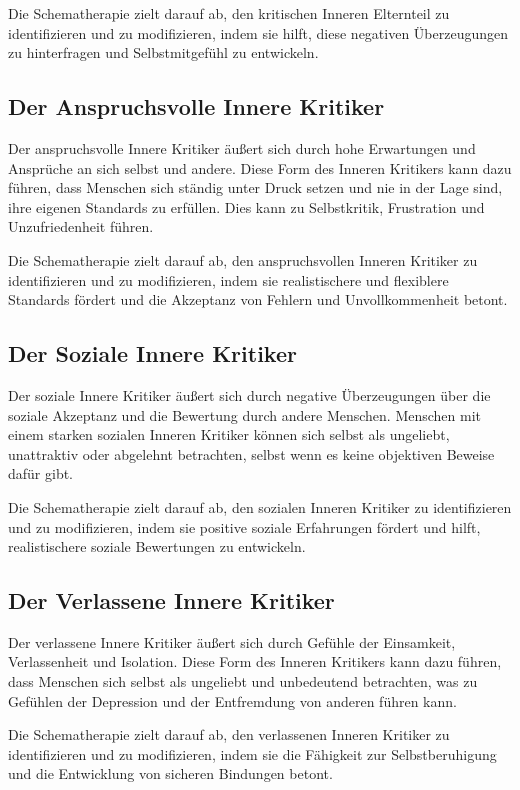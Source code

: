 Die Schematherapie zielt darauf ab, den kritischen Inneren Elternteil zu identifizieren und zu modifizieren, indem sie hilft, diese negativen Überzeugungen zu hinterfragen und Selbstmitgefühl zu entwickeln.

\subsection{Der Anspruchsvolle Innere Kritiker}

Der anspruchsvolle Innere Kritiker äußert sich durch hohe Erwartungen und Ansprüche an sich selbst und andere. Diese Form des Inneren Kritikers kann dazu führen, dass Menschen sich ständig unter Druck setzen und nie in der Lage sind, ihre eigenen Standards zu erfüllen. Dies kann zu Selbstkritik, Frustration und Unzufriedenheit führen.

Die Schematherapie zielt darauf ab, den anspruchsvollen Inneren Kritiker zu identifizieren und zu modifizieren, indem sie realistischere und flexiblere Standards fördert und die Akzeptanz von Fehlern und Unvollkommenheit betont.

\subsection{Der Soziale Innere Kritiker}

Der soziale Innere Kritiker äußert sich durch negative Überzeugungen über die soziale Akzeptanz und die Bewertung durch andere Menschen. Menschen mit einem starken sozialen Inneren Kritiker können sich selbst als ungeliebt, unattraktiv oder abgelehnt betrachten, selbst wenn es keine objektiven Beweise dafür gibt.

Die Schematherapie zielt darauf ab, den sozialen Inneren Kritiker zu identifizieren und zu modifizieren, indem sie positive soziale Erfahrungen fördert und hilft, realistischere soziale Bewertungen zu entwickeln.

\subsection{Der Verlassene Innere Kritiker}

Der verlassene Innere Kritiker äußert sich durch Gefühle der Einsamkeit, Verlassenheit und Isolation. Diese Form des Inneren Kritikers kann dazu führen, dass Menschen sich selbst als ungeliebt und unbedeutend betrachten, was zu Gefühlen der Depression und der Entfremdung von anderen führen kann.

Die Schematherapie zielt darauf ab, den verlassenen Inneren Kritiker zu identifizieren und zu modifizieren, indem sie die Fähigkeit zur Selbstberuhigung und die Entwicklung von sicheren Bindungen betont.

